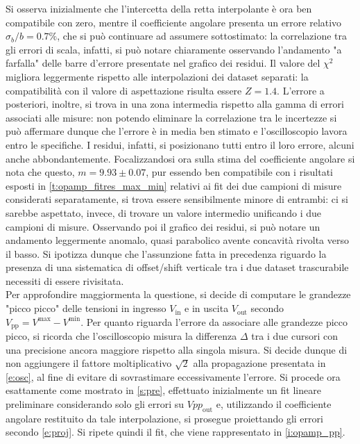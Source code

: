 \documentclass[a4paper,11pt]{article} %
\begin{document}
\noindent Si osserva inizialmente che l'intercetta della retta interpolante è ora ben compatibile con zero, mentre il
coefficiente angolare presenta un errore relativo $\sigma_{b}/b=0.7\%$, che si può continuare ad assumere sottostimato:
la correlazione tra gli errori di scala, infatti, si può notare chiaramente osservando l'andamento "a farfalla" delle
barre d'errore presentate nel grafico dei residui. Il valore del $\chi^2$ migliora leggermente rispetto alle
interpolazioni dei dataset separati: la compatibilità con il valore di aspettazione risulta essere $Z=1.4$. L'errore a
posteriori, inoltre, si trova in una zona intermedia rispetto alla gamma di errori associati alle misure: non potendo
eliminare la correlazione tra le incertezze si può affermare dunque che l'errore è in media ben stimato e
l'oscilloscopio lavora entro le specifiche. I residui, infatti, si posizionano tutti entro il loro errore, alcuni anche
abbondantemente. Focalizzandosi ora sulla stima del coefficiente angolare si nota che questo, $m=9.93\pm 0.07$, pur
essendo ben compatibile con i risultati esposti in  \autoref{t:opamp_fitres_max_min} relativi ai fit dei due campioni
di misure considerati separatamente, si trova essere sensibilmente minore di entrambi: ci si sarebbe aspettato, invece,
di trovare un valore intermedio unificando i due campioni di misure. Osservando poi il grafico dei residui, si può
notare un andamento leggermente anomalo, quasi parabolico avente concavità rivolta verso il basso. Si ipotizza dunque
che l'assunzione fatta in precedenza riguardo la presenza di una sistematica di offset/shift verticale tra i due dataset
trascurabile necessiti di essere rivisitata. \\
Per approfondire maggiormenta la questione, si decide di computare le grandezze "picco picco" delle tensioni in ingresso
$V_{\text{in}}$ e in uscita $V_{\text{out}}$ secondo $V_{\text{pp}}=V^{\text{max}}-V^{\text{min}}$. Per quanto riguarda
l'errore da associare alle grandezze picco picco, si ricorda che l'oscilloscopio misura la differenza $\Delta$ tra i due
cursori con una precisione ancora maggiore rispetto alla singola misura. Si decide dunque di non aggiungere il fattore
moltiplicativo $\sqrt{2}$ alla propagazione presentata in  \autoref{e:osc}, al fine di evitare di sovrastimare
eccessivamente l'errore. Si procede ora esattamente come mostrato in  \autoref{s:pre}, effettuato inizialmente un fit
lineare preliminare considerando solo gli errori su $Vpp_{\text{out}}$ e, utilizzando il coefficiente angolare
restituito da tale interpolazione, si prosegue proiettando gli errori secondo  \autoref{e:proj}. Si ripete quindi
il fit, che viene rappresentato in \autoref{i:opamp_pp}.
\end{document}

